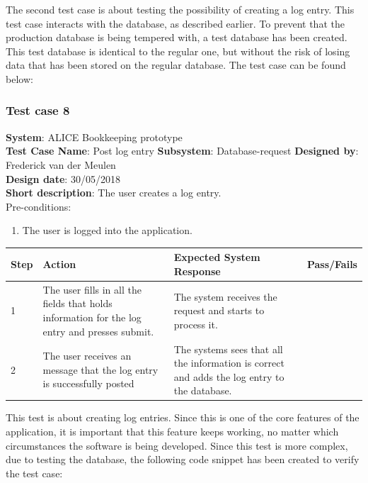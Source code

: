 \documentclass[paper=a4, fontsize=11pt,twoside]{scrartcl}	%
\begin{document}
The second test case is about testing the possibility of creating a log entry. This test case interacts with the database, as described earlier. To prevent that the production database is being tempered with, a test database has been created. This test database is identical to the regular one, but without the risk of losing data that has been stored on the regular database. The test case can be found below:

\subsubsection{Test case 8}
\textbf{System}:  ALICE Bookkeeping prototype \\
\textbf{Test Case Name}:  Post log entry
\textbf{Subsystem}:  Database-request
\textbf{Designed by}:  Frederick van der Meulen\\
\textbf{Design date}: 30/05/2018 \\
\textbf{Short description}: The user creates a log entry. \\

Pre-conditions: 
\begin{enumerate}
\item The user is logged into the application.
\end{enumerate}


\begin{longtable}{ | p{0.8cm} | p{4.5cm} | p{6cm}  | p{1.5cm} |}
\hline
Step & Action & Expected System Response & Pass/Fails  \\ \hline
1 & The user fills in all the fields that holds information for the log entry and presses submit. & The system receives the request and starts to process it. &  \\ \hline
2 & The user receives an message that the log entry is successfully posted & The systems sees that all the information is correct and adds the log entry to the database. &  \\ \hline
\end{longtable}

This test is about creating log entries. Since this is one of the core features of the application, it is important that this feature keeps working, no matter which circumstances the software is being developed. 
Since this test is more complex, due to testing the database, the following code snippet has been created to verify the test case:
\end{document}
